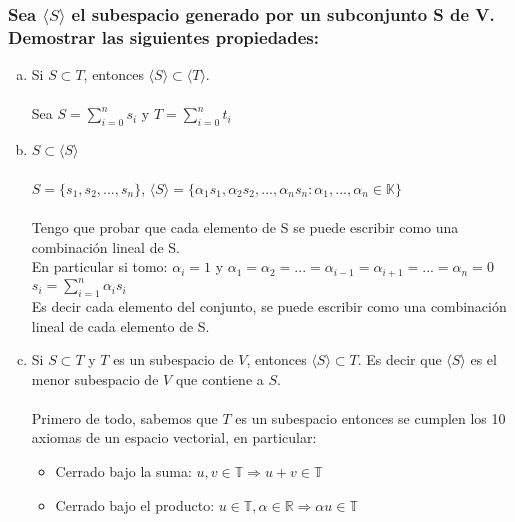 \documentclass{article}
\begin{document}
\subsubsection{Sea $\langle S\rangle$ el subespacio generado por un subconjunto S de V. Demostrar las siguientes
propiedades: }
\begin{enumerate}[a.]
	\item
		Si $S \subset T$, entonces $\langle S\rangle \subset \langle T\rangle$. \\ \\
		Sea $S = \displaystyle \sum_{i=0}^{n}{s_i}$ y $T = \displaystyle \sum_{i=0}^{n}{t_i}$
	\item
		$S \subset \langle S \rangle$ \\ \\
		$S = \lbrace s_1,s_2,...,s_n \rbrace$,
		$\langle S \rangle = \lbrace \alpha_1 s_1, \alpha_2 s_2, ..., \alpha_n s_n : \alpha_1,...,\alpha_n \in \mathbb{K} \rbrace$ \\ \\
		Tengo que probar que cada elemento de S se puede escribir como una combinación lineal de S. \\
		En particular si tomo: $\alpha_i = 1$ y
		$\alpha_1 = \alpha_2 = ... = \alpha_{i-1} = \alpha_{i+1} = ... = \alpha_n = 0$ \\
		$s_i = \displaystyle \sum_{i=1}^{n}{\alpha_i s_i}$ \\
		Es decir cada elemento del conjunto, se puede escribir como una combinación lineal de cada elemento de S.
	\item
		Si $S \subset T$ y $T$ es un subespacio de $V$, entonces $\langle S \rangle \subset T$. Es decir que $\langle S \rangle$
		es el menor subespacio de $V$ que contiene a $S$. \\ \\
		Primero de todo, sabemos que $T$ es un subespacio entonces se cumplen los 10 axiomas de un espacio vectorial, en particular:
		\begin{itemize}
		\item
			Cerrado bajo la suma: 
			$u,v \in \mathbb{T} \Rightarrow u+v \in \mathbb{T}$
		\item 
			Cerrado bajo el producto: 
			$u \in \mathbb{T}, \alpha \in \mathbb{R} \Rightarrow \alpha u \in \mathbb{T}$
		\end{itemize}
	

\end{enumerate}
\end{document}
